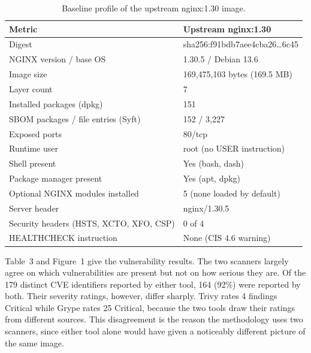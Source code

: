 \documentclass[10pt,letterpaper,twocolumn]{article}
\begin{document}
\begin{table}[tb]
\caption{Baseline profile of the upstream nginx:1.30 image.}
\label{tab:baseline}
\small
\begin{tabularx}{\columnwidth}{@{}LP{0.44\columnwidth}@{}}
\toprule
\textbf{Metric} & \textbf{Upstream nginx:1.30} \\
\midrule
Digest & sha256:\allowbreak f91bdb7aee4cba26\ldots6c45 \\
NGINX version / base OS & 1.30.5 / Debian 13.6 \\
Image size & 169,475,103 bytes (169.5 MB) \\
Layer count & 7 \\
Installed packages (dpkg) & 151 \\
SBOM packages / file entries (Syft) & 152 / 3,227 \\
Exposed ports & 80/tcp \\
Runtime user & root (no USER instruction) \\
Shell present & Yes (bash, dash) \\
Package manager present & Yes (apt, dpkg) \\
Optional NGINX modules installed & 5 (none loaded by default) \\
Server header & nginx/1.30.5 \\
Security headers (HSTS, XCTO, XFO, CSP) & 0 of 4 \\
HEALTHCHECK instruction & None (CIS 4.6 warning) \\
\bottomrule
\end{tabularx}
\end{table}

Table~3 and Figure~1 give the vulnerability results. The two scanners largely agree on which vulnerabilities are present but not on how serious they are. Of the 179 distinct CVE identifiers reported by either tool, 164 (92\%) were reported by both. Their severity ratings, however, differ sharply. Trivy rates 4 findings Critical while Grype rates 25 Critical, because the two tools draw their ratings from different sources. This disagreement is the reason the methodology uses two scanners, since either tool alone would have given a noticeably different picture of the same image.
\end{document}
